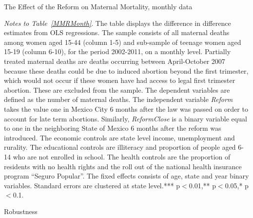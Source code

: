 \documentclass[a4paper, 11pt]{article}
\begin{document}
\begin{spacing}{1.4}
\begin{table}\caption{The Effect of the Reform on Maternal Mortality, monthly data} \label{MMRMonth}
  \begin{threeparttable}
    {\footnotesize  }
    \begin{tablenotes}
      \footnotesize
    \item \textit{Notes to Table~\ref{MMRMonth}}. The table displays the difference in difference estimates from OLS regressions. The sample consists of all maternal deaths among women aged 15-44 (column 1-5) and sub-sample of teenage women aged 15-19 (column 6-10), for the period 2002-2011, on a monthly level. Partially treated maternal deaths are deaths occurring between April-October 2007 because these deaths could be due to induced abortion beyond the first trimester, which would not occur if these women have had access to legal first trimester abortion. These are excluded from the sample. The dependent variables are defined as the number of maternal deaths. The independent variable \textit{Reform} takes the value one in Mexico City 6 months after the law was passed on order to account for late term abortions. Similarly, \textit{ReformClose} is a binary variable equal to one in the neighboring State of Mexico 6 months after the reform was introduced. The economic controls are state level income, unemployment and rurality. The educational controls are illiteracy and proportion of people aged 6-14 who are not enrolled in school. The health controls are the proportion of residents with no health rights and the roll out of the national health insurance program ``Seguro Popular''. The fixed effects consists of age, state and year binary variables. Standard errors are clustered at state level.*** p$<$0.01,** p$<$0.05,* p$<$0.1.
    \end{tablenotes} 
  \end{threeparttable}
\end{table}


\begin{table}\centering  \caption{Robustness} \label{robust_reg}
  \begin{ThreePartTable}
    \begin{subtable}{0.9\textwidth}\centering {}\label{robust_reg:a}
      {\scriptsize 	}
    \end{subtable}%
    
    \begin{subtable}{0.9\textwidth}\centering{}\label{robust_reg:b}
      {\scriptsize 	}
    \end{subtable}%
    

\end{ThreePartTable}
\end{table}
\end{spacing}
\end{document}
